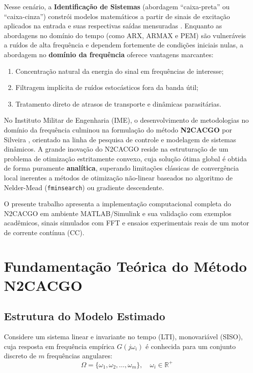 \documentclass[journal,10pt,twocolumn]{IEEEtran}
\begin{document}
Nesse cenário, a \textbf{Identificação de Sistemas} (abordagem ``caixa-preta'' ou ``caixa-cinza'') constrói modelos matemáticos a partir de sinais de excitação aplicados na entrada e suas respectivas saídas mensuradas \cite{lathi2008,ogata2010}. Enquanto as abordagens no domínio do tempo (como ARX, ARMAX e PEM) são vulneráveis a ruídos de alta frequência e dependem fortemente de condições iniciais nulas, a abordagem no \textbf{domínio da frequência} oferece vantagens marcantes:
\begin{enumerate}
    \item Concentração natural da energia do sinal em frequências de interesse;
    \item Filtragem implícita de ruídos estocásticos fora da banda útil;
    \item Tratamento direto de atrasos de transporte e dinâmicas parasitárias.
\end{enumerate}

No Instituto Militar de Engenharia (IME), o desenvolvimento de metodologias no domínio da frequência culminou na formulação do método \textbf{N2CACGO} por Silveira \cite{silveira2006}, orientado na linha de pesquisa de controle e modelagem de sistemas dinâmicos. A grande inovação do N2CACGO reside na estruturação de um problema de otimização estritamente convexo, cuja solução ótima global é obtida de forma puramente \textbf{analítica}, superando limitações clássicas de convergência local inerentes a métodos de otimização não-linear baseados no algoritmo de Nelder-Mead (\texttt{fminsearch}) ou gradiente descendente.

O presente trabalho apresenta a implementação computacional completa do N2CACGO em ambiente MATLAB/Simulink e sua validação com exemplos acadêmicos, sinais simulados com FFT e ensaios experimentais reais de um motor de corrente contínua (CC).

\section{Fundamentação Teórica do Método N2CACGO}
\subsection{Estrutura do Modelo Estimado}
Considere um sistema linear e invariante no tempo (LTI), monovariável (SISO), cuja resposta em frequência empírica $G(j\omega_i)$ é conhecida para um conjunto discreto de $m$ frequências angulares:
\begin{equation}
    \Omega = \{\omega_1, \omega_2, \dots, \omega_m\}, \quad \omega_i \in \mathbb{R}^+
\end{equation}
\end{document}
